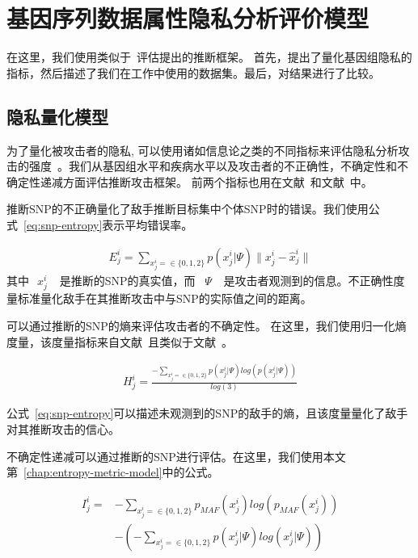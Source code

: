 \section{基因序列数据属性隐私分析评价模型} 


在这里，我们使用类似于~\cite{humbert2013addressing,deznabi2018inference}评估提出的推断框架。 首先，提出了量化基因组隐私的指标，然后描述了我们在工作中使用的数据集。最后，对结果进行了比较。

\subsection{隐私量化模型}

为了量化被攻击者的隐私, 可以使用诸如信息论之类的不同指标来评估隐私分析攻击的强度~\cite{marchini2007newa,shokri2011quantifying,serjantov2002towards}。我们从基因组水平和疾病水平以及攻击者的不正确性，不确定性和不确定性递减方面评估推断攻击框架。 前两个指标也用在文献~\cite{humbert2013addressing}和文献~\cite{deznabi2018inference}中。

推断SNP的不正确量化了敌手推断目标集中个体SNP时的错误。我们使用公式~\ref{eq:snp-entropy}表示平均错误率。

\begin{equation}
\begin{aligned}\label{eq:snp-error-rate}
E^i_j=\sum_{x^i_j=\in \{0,1,2\}}{p(x^i_j|\Psi)\|x^i_j - \hat{x}^i_j\|}
\end{aligned}
\end{equation}
其中~$~x^i_j~$~ 是推断的SNP的真实值，而 ~$\Psi~$~ 是攻击者观测到的信息。不正确性度量标准量化敌手在其推断攻击中与SNP的实际值之间的距离。

可以通过推断的SNP的熵来评估攻击者的不确定性。 在这里，我们使用归一化熵度量，该度量指标来自文献~\cite{humbert2013addressing}且类似于文献~\cite{deznabi2018inference}。

\begin{equation}
\begin{aligned}\label{eq:snp-entropy}
H^i_j=
\frac{-\sum_{x^i_j=\in \{0,1,2\}}{p(x^i_j|\Psi)log(p(x^i_j|\Psi))}}{log(3)}
\end{aligned}
\end{equation}

公式~\ref{eq:snp-entropy}可以描述未观测到的SNP的敌手的熵，且该度量量化了敌手对其推断攻击的信心。

不确定性递减可以通过推断的SNP进行评估。在这里，我们使用本文第~\ref{chap:entropy-metric-model}中的公式。

\begin{equation}\label{eq:snp-mutual-information}
\begin{aligned}
I^i_j=& -\sum_{x^i_j=\in \{0,1,2\}}p_{MAF}(x^i_j)log(p_{MAF}(x^i_j))  \nonumber \\
& - (-\sum_{x^i_j=\in \{0,1,2\}}{p(x^i_j|\Psi)log(x^i_j|\Psi)})
\end{aligned}
\end{equation}

